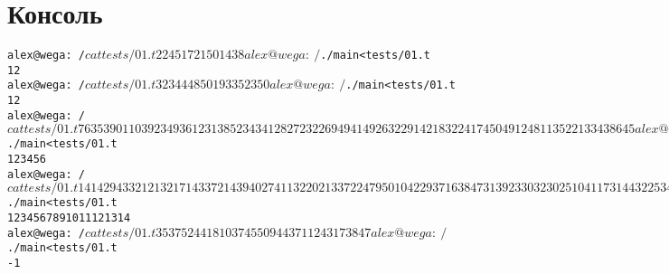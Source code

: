 \section{Консоль}
\begin{alltt}
alex@wega:~/$ cat tests/01.t 
2 2
45 17 21
50 14 38
alex@wega:~/$ ./main < tests/01.t 
1 2 
alex@wega:~/$ cat tests/01.t 
3 2
34 4 48
50 19 33
5 23 50
alex@wega:~/$ ./main < tests/01.t 
1 2 
alex@wega:~/$ cat tests/01.t 
7 6
35 39 0 11 0 39 23
4 9 36 12 31 38 5
23 43 41 28 27 23 2
26 9 49 41 49 26 32
29 1 42 18 32 24 17
45 0 49 12 48 11 35
22 1 3 34 38 6 45
alex@wega:~/$ ./main < tests/01.t 
1 2 3 4 5 6 
alex@wega:~/$ cat tests/01.t 
14 14
29 43 3 21 21 32 17 14 3 37 21 4 39 40 27
41 13 2 20 21 3 37 22 47 9 50 10 42 29 37
16 38 47 31 39 23 30 32 30 25 1 0 41 17 31
44 32 25 34 17 1 40 21 8 0 45 29 46 2 34
13 39 0 37 4 24 31 20 10 0 30 20 16 20 34
1 50 46 22 8 2 5 32 25 22 47 15 24 0 49
46 35 19 45 32 40 37 49 26 20 2 40 10 25 5
3 39 44 45 21 38 35 6 20 6 43 11 34 21 35
33 39 17 46 22 48 38 16 28 23 26 47 40 12 34
2 34 24 37 32 10 16 50 10 16 17 4 9 23 5
7 26 36 16 39 17 32 27 49 13 42 27 47 41 47
24 15 33 5 47 41 26 32 13 14 36 40 5 26 5
2 44 13 50 41 45 34 48 40 13 42 18 32 7 33
6 28 40 38 10 5 20 26 45 4 31 8 49 31 9
alex@wega:~/$ ./main < tests/01.t 
1 2 3 4 5 6 7 8 9 10 11 12 13 14 
alex@wega:~/$ cat tests/01.t 
3 5
37 5 24 41 8 10
37 45 50 9 44 37
1 12 43 17 38 47
alex@wega:~/$ ./main < tests/01.t 
-1
\end{alltt}
\pagebreak
